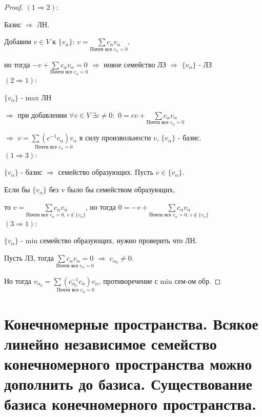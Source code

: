 \documentclass[12pt, fleqn]{article}
\begin{document}
    \begin{proof}
        $(1 \Rightarrow 2)$: 
        
        Базис $\Rightarrow$ ЛН. 
        
        Добавим $v \in V$ к $\{v_\alpha\}$: $v=\underset{\text{Почти все $c_\alpha = 0$}}{\sum c_\alpha v_\alpha}$, 
        
        но тогда $-v+\underset{\text{Почти все $c_\alpha = 0$}}{\sum c_\alpha v_\alpha = 0}$ $\Rightarrow$ новое семейство ЛЗ $\Rightarrow$ $\{v_\alpha\}$ - ЛЗ
        \\
        $(2 \Rightarrow 1)$: 
        
        $\{v_\alpha\}$ - max ЛН 
        
        $\Rightarrow$ при добавлении $\forall v \in V\ \exists c \neq 0:$ $0 = c v + \underset{\text{Почти все $c_\alpha = 0$}}{\sum c_\alpha v_\alpha}$ 
        
        $\Rightarrow$ $v=\underset{\text{Почти все $c_\alpha = 0$}}{\sum (c^{-1} c_\alpha) v_\alpha}$ в силу произвольности $v$, $\{v_\alpha\}$ - базис.
        \\
        $(1 \Rightarrow 3)$: 
        
        $\{v_\alpha\}$ - базис $\Rightarrow$ семейство образующих. Пусть $v \in \{v_\alpha\}$. 
        
        Если бы $\{v_\alpha\}$ без v было бы семейством образующих, 
        
        то $v=\underset{\text{Почти все $c_\alpha = 0$, $v \notin \{v_\alpha\}$}}{\sum c_\alpha v_\alpha}$, но тогда $0=-v+\underset{\text{Почти все $c_\alpha = 0$, $v \notin \{v_\alpha\}$}}{\sum c_\alpha v_\alpha}$
        \\
        $(3 \Rightarrow 1)$: 
        
        $\{v_\alpha\}$ - min семейство образующих, нужно проверить что ЛН. 
        
        Пусть ЛЗ, тогда $\underset{\text{Почти все $c_\alpha = 0$}}{\sum c_\alpha v_\alpha = 0}$ $\Rightarrow$ $c_{\alpha_0} \neq 0$. 
        
        Но тогда $v_{\alpha_0} = \underset{\text{Почти все $c_\alpha = 0$}}{\sum (c_{\alpha_0}^{-1} c_\alpha) v_\alpha}$, противоречение с min сем-ом обр.
    \end{proof}

\section{Конечномерные пространства. Всякое линейно независимое семейство конечномерного пространства можно дополнить 
    до базиса. Существование базиса конечномерного пространства.}
    
\end{document}

